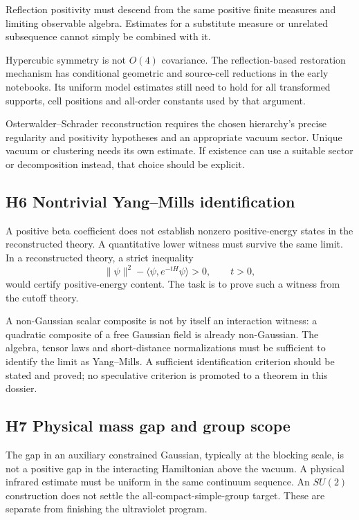 Reflection positivity must descend from the same
positive finite measures and limiting observable
algebra. Estimates for a substitute measure or
unrelated subsequence cannot simply be combined
with it.

Hypercubic symmetry is not \(O(4)\) covariance.
The reflection-based restoration mechanism has
conditional geometric and source-cell reductions
in the early notebooks. Its uniform model
estimates still need to hold for all transformed
supports, cell positions and all-order constants
used by that argument.

Osterwalder--Schrader reconstruction requires the
chosen hierarchy's precise regularity and
positivity hypotheses and an appropriate vacuum
sector. Unique vacuum or clustering needs its
own estimate. If existence can use a suitable
sector or decomposition instead, that choice
should be explicit.

\subsection{H6 Nontrivial Yang--Mills identification}

A positive beta coefficient does not establish
nonzero positive-energy states in the reconstructed
theory. A quantitative lower witness must survive
the same limit. In a reconstructed theory, a
strict inequality
\[
 \|\psi\|^2-\langle\psi,e^{-tH}\psi\rangle>0,\qquad t>0,
\]
would certify positive-energy content. The task is
to prove such a witness from the cutoff theory.

A non-Gaussian scalar composite is not by itself
an interaction witness: a quadratic composite of
a free Gaussian field is already non-Gaussian.
The algebra, tensor laws and short-distance
normalizations must be sufficient to identify
the limit as Yang--Mills. A sufficient
identification criterion should be stated and
proved; no speculative criterion is promoted to
a theorem in this dossier.

\subsection{H7 Physical mass gap and group scope}

The gap in an auxiliary constrained Gaussian,
typically at the blocking scale, is not a
positive gap in the interacting Hamiltonian
above the vacuum. A physical infrared estimate
must be uniform in the same continuum sequence.
An \(SU(2)\) construction does not settle the
all-compact-simple-group target. These are
separate from finishing the ultraviolet program.

